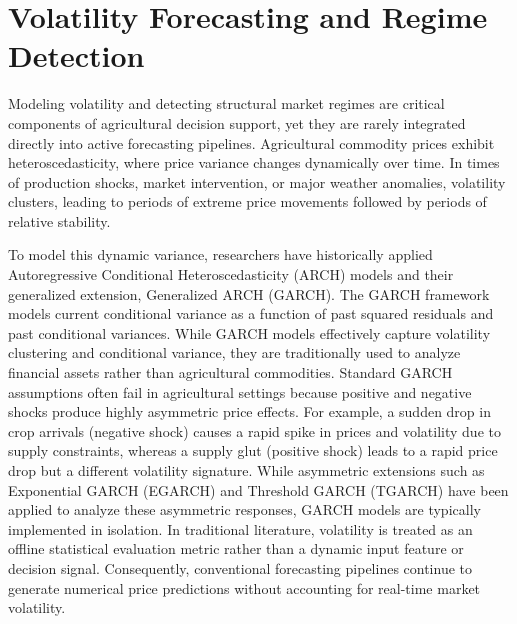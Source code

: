 \documentclass[12pt,a4paper]{report}
\theoremstyle{definition}
\theoremstyle{remark}
\begin{document}
\section{Volatility Forecasting and Regime Detection}

Modeling volatility and detecting structural market regimes are critical components of agricultural decision support, yet they are rarely integrated directly into active forecasting pipelines. Agricultural commodity prices exhibit heteroscedasticity, where price variance changes dynamically over time. In times of production shocks, market intervention, or major weather anomalies, volatility clusters, leading to periods of extreme price movements followed by periods of relative stability. 

To model this dynamic variance, researchers have historically applied Autoregressive Conditional Heteroscedasticity (ARCH) models and their generalized extension, Generalized ARCH (GARCH). The GARCH framework models current conditional variance as a function of past squared residuals and past conditional variances. While GARCH models effectively capture volatility clustering and conditional variance, they are traditionally used to analyze financial assets rather than agricultural commodities. Standard GARCH assumptions often fail in agricultural settings because positive and negative shocks produce highly asymmetric price effects. For example, a sudden drop in crop arrivals (negative shock) causes a rapid spike in prices and volatility due to supply constraints, whereas a supply glut (positive shock) leads to a rapid price drop but a different volatility signature. While asymmetric extensions such as Exponential GARCH (EGARCH) and Threshold GARCH (TGARCH) have been applied to analyze these asymmetric responses, GARCH models are typically implemented in isolation. In traditional literature, volatility is treated as an offline statistical evaluation metric rather than a dynamic input feature or decision signal. Consequently, conventional forecasting pipelines continue to generate numerical price predictions without accounting for real-time market volatility.
\end{document}
